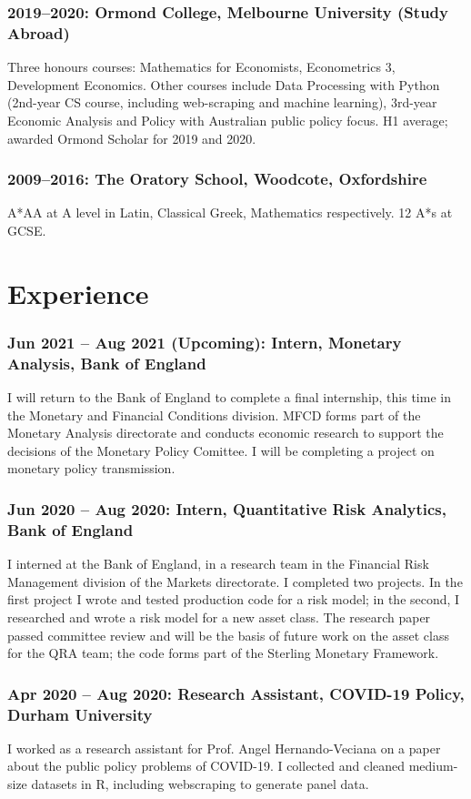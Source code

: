 \documentclass[a4]{article}
\begin{document}
\subsubsection*{2019--2020: Ormond College, Melbourne University (Study Abroad)}
Three honours courses: Mathematics for Economists, Econometrics 3, Development Economics. Other courses include Data Processing with Python (2nd-year CS course, including web-scraping and machine learning), 3rd-year Economic Analysis and Policy with Australian public policy focus. H1 average; awarded Ormond Scholar for 2019 and 2020.

\subsubsection*{2009--2016: The Oratory School, Woodcote, Oxfordshire}
A*AA at A level in Latin, Classical Greek, Mathematics respectively. 12 A*s at GCSE.
  
\section*{Experience}
\subsubsection*{Jun 2021 -- Aug 2021 (Upcoming): Intern, Monetary Analysis, Bank of England}
I will return to the Bank of England to complete a final internship, this time in the Monetary and Financial Conditions division. MFCD forms part of the Monetary Analysis directorate and conducts economic research to support the decisions of the Monetary Policy Comittee. I will be completing a project on monetary policy transmission.

\subsubsection*{Jun 2020 -- Aug 2020: Intern, Quantitative Risk Analytics, Bank of England}
I interned at the Bank of England, in a research team in the Financial Risk Management division of the Markets directorate. I completed two projects. In the first project I wrote and tested production code for a risk model; in the second, I researched and wrote a risk model for a new asset class. The research paper passed committee review and will be the basis of future work on the asset class for the QRA team; the code forms part of the Sterling Monetary Framework. 

\subsubsection*{Apr 2020 -- Aug 2020: Research Assistant, COVID-19 Policy, Durham University}
I worked as a research assistant for Prof. Angel Hernando-Veciana on a paper about the public policy problems of COVID-19. I collected and cleaned medium-size datasets in R, including webscraping to generate panel data.%
\end{document}
